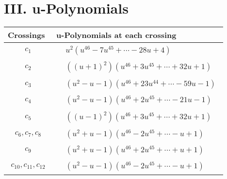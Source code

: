 \documentclass[1p]{elsarticle_modified}
\theoremstyle{definition}
\begin{document}
\centering \section*{ III. u-Polynomials}
\begin{tabular}{m{50pt}|m{274pt}}
Crossings & \hspace{64pt}u-Polynomials at each crossing \\
\hline $$\begin{aligned}c_{1}\end{aligned}$$&$\begin{aligned}
&u^2(u^{46}-7 u^{45}+\cdots-28 u+4)
\end{aligned}$\\
\hline $$\begin{aligned}c_{2}\end{aligned}$$&$\begin{aligned}
&((u+1)^2)(u^{46}+3 u^{45}+\cdots+32 u+1)
\end{aligned}$\\
\hline $$\begin{aligned}c_{3}\end{aligned}$$&$\begin{aligned}
&(u^2- u-1)(u^{46}+23 u^{44}+\cdots-59 u-1)
\end{aligned}$\\
\hline $$\begin{aligned}c_{4}\end{aligned}$$&$\begin{aligned}
&(u^2- u-1)(u^{46}+2 u^{45}+\cdots-21 u-1)
\end{aligned}$\\
\hline $$\begin{aligned}c_{5}\end{aligned}$$&$\begin{aligned}
&((u-1)^2)(u^{46}+3 u^{45}+\cdots+32 u+1)
\end{aligned}$\\
\hline $$\begin{aligned}c_{6},c_{7},c_{8}\end{aligned}$$&$\begin{aligned}
&(u^2+u-1)(u^{46}-2 u^{45}+\cdots- u+1)
\end{aligned}$\\
\hline $$\begin{aligned}c_{9}\end{aligned}$$&$\begin{aligned}
&(u^2+u-1)(u^{46}+2 u^{45}+\cdots+u+1)
\end{aligned}$\\
\hline $$\begin{aligned}c_{10},c_{11},c_{12}\end{aligned}$$&$\begin{aligned}
&(u^2- u-1)(u^{46}-2 u^{45}+\cdots- u+1)
\end{aligned}$\\
\hline
\end{tabular}\newpage\renewcommand{\arraystretch}{1}
\end{document}
